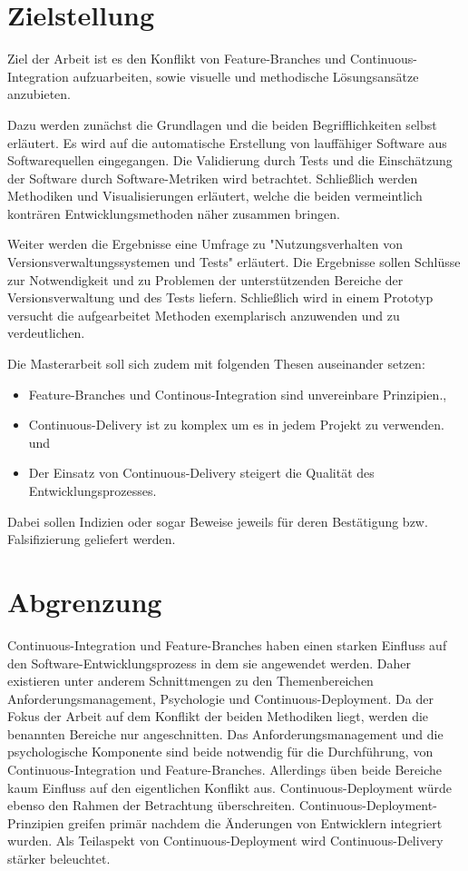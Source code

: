\section{Zielstellung}

Ziel der Arbeit ist es den Konflikt von \glqq Feature-Branches\grqq{} und \glqq Continuous-Integration\grqq{} aufzuarbeiten, sowie visuelle und methodische Lösungsansätze anzubieten. 

Dazu werden zunächst die Grundlagen und die beiden Begrifflichkeiten selbst erläutert. Es wird auf die automatische Erstellung von lauffähiger Software aus Softwarequellen eingegangen. Die Validierung durch Tests und die Einschätzung der Software durch Software-Metriken wird betrachtet. Schließlich werden Methodiken und Visualisierungen erläutert, welche die beiden vermeintlich konträren Entwicklungsmethoden näher zusammen bringen.

Weiter werden die Ergebnisse eine Umfrage zu "Nutzungsverhalten von Versionsverwaltungssystemen und Tests" erläutert. Die Ergebnisse sollen Schlüsse zur Notwendigkeit und zu Problemen der unterstützenden Bereiche der Versionsverwaltung und des Tests liefern. Schließlich wird in einem Prototyp versucht die aufgearbeitet Methoden exemplarisch anzuwenden und zu verdeutlichen.

Die Masterarbeit soll sich zudem mit folgenden Thesen auseinander setzen: \\
\begin{itemize}
\item \glqq Feature-Branches und Continous-Integration sind unvereinbare Prinzipien.\grqq{},
\item \glqq Continuous-Delivery ist zu komplex um es in jedem Projekt zu verwenden.\grqq{} und
\item \glqq Der Einsatz von Continuous-Delivery steigert die Qualität des Entwicklungsprozesses.\grqq{}
\end{itemize}
Dabei sollen Indizien oder sogar Beweise jeweils für deren Bestätigung bzw. Falsifizierung geliefert werden.

\section{Abgrenzung}

Continuous-Integration und Feature-Branches haben einen starken Einfluss auf den Software-Entwicklungsprozess in dem sie angewendet werden. Daher existieren unter anderem Schnittmengen zu den Themenbereichen Anforderungsmanagement, Psychologie und Continuous-Deployment. 
Da der Fokus der Arbeit auf dem Konflikt der beiden Methodiken liegt, werden die benannten Bereiche nur angeschnitten. Das Anforderungsmanagement und die psychologische Komponente sind beide notwendig für die Durchführung, von Continuous-Integration und Feature-Branches. Allerdings üben beide Bereiche kaum Einfluss auf den eigentlichen Konflikt aus. Continuous-Deployment würde ebenso den Rahmen der Betrachtung überschreiten. Continuous-Deployment-Prinzipien greifen primär nachdem die Änderungen von Entwicklern integriert wurden. Als Teilaspekt von Continuous-Deployment wird Continuous-Delivery stärker beleuchtet.